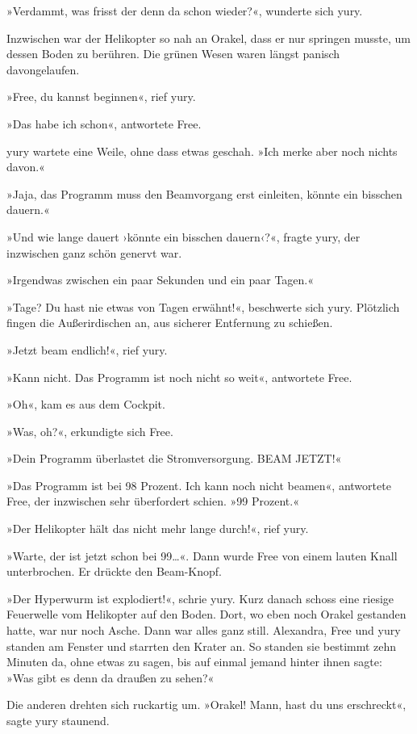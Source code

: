 »Verdammt, was frisst der denn da schon wieder?«, wunderte sich yury.

Inzwischen war der Helikopter so nah an Orakel, dass er nur springen musste, um dessen Boden zu berühren. Die grünen Wesen waren längst panisch davongelaufen.

»Free, du kannst beginnen«, rief yury.

»Das habe ich schon«, antwortete Free.

yury wartete eine Weile, ohne dass etwas geschah. »Ich merke aber noch nichts davon.«

»Jaja, das Programm muss den Beamvorgang erst einleiten, könnte ein bisschen dauern.«

»Und wie lange dauert ›könnte ein bisschen dauern‹?«, fragte yury, der inzwischen ganz schön genervt war.

»Irgendwas zwischen ein paar Sekunden und ein paar Tagen.«

»Tage? Du hast nie etwas von Tagen erwähnt!«, beschwerte sich yury. Plötzlich fingen die Außerirdischen an, aus sicherer Entfernung zu schießen.

»Jetzt beam endlich!«, rief yury.

»Kann nicht. Das Programm ist noch nicht so weit«, antwortete Free.

»Oh«, kam es aus dem Cockpit.

»Was, oh?«, erkundigte sich Free.

»Dein Programm überlastet die Stromversorgung. BEAM JETZT!«

»Das Programm ist bei 98 Prozent. Ich kann noch nicht beamen«, antwortete Free, der inzwischen sehr überfordert schien. »99 Prozent.«

»Der Helikopter hält das nicht mehr lange durch!«, rief yury.

»Warte, der ist jetzt schon bei 99…«. Dann wurde Free von einem lauten Knall unterbrochen. Er drückte den Beam-Knopf.

»Der Hyperwurm ist explodiert!«, schrie yury. Kurz danach schoss eine riesige Feuerwelle vom Helikopter auf den Boden. Dort, wo eben noch Orakel gestanden hatte, war nur noch Asche. Dann war alles ganz still. Alexandra, Free und yury standen am Fenster und starrten den Krater an. So standen sie bestimmt zehn Minuten da, ohne etwas zu sagen, bis auf einmal jemand hinter ihnen sagte: »Was gibt es denn da draußen zu sehen?«

Die anderen drehten sich ruckartig um. »Orakel! Mann, hast du uns erschreckt«, sagte yury staunend.

